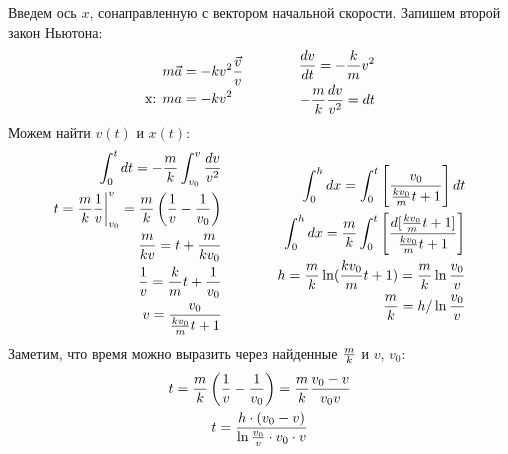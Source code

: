 \documentclass[a5paper,10pt]{article}
\begin{document}
Введем ось $x$, сонаправленную с вектором начальной скорости.
Запишем второй закон Ньютона:
\begin{equation*}
    \xdef\km{\frac{k}{m}}\xdef\mk{\frac{m}{k}}\xdef\mgk{\frac{mg}{k}}%
    \begin{aligned}[c]
        m\vec{a}&=-kv^2\frac{\vec{v}}{v}\\
        \text{x: } ma&=-kv^2\\
    \end{aligned}
        \qquad\qquad
    \begin{aligned}[c]
        \frac{dv}{dt}=-\km{}v^2\\
        -\mk\frac{dv}{v^2}=dt\\
    \end{aligned}
\end{equation*}
Можем найти $v(t)$ и $x(t)$:
\begin{equation*}
    \begin{aligned}[c]
        \int_0^{t}dt=-\mk\int_{v_0}^{v}\frac{dv}{v^2}\\
        t=\mk\frac{1}{v}\bigg|_{v_0}^{v}=\mk\left(\frac{1}{v}- \frac{1}{v_0}\right)\\
        \frac{m}{kv}=t+\frac{m}{kv_0}\\
        \frac{1}{v}=\km{t}+\frac{1}{v_0}\\
        v=\frac{v_0}{\frac{kv_0}{m}t+1}
    \end{aligned}
        \qquad\qquad
    \begin{aligned}[c]
        \int_0^{h}dx=\int_{0}^{t}\left[\frac{v_0}{\frac{kv_0}{m}t+1}\right]dt\\
        \int_0^{h}dx=\frac{m}{k}\int_{0}^{t}\left[\frac{d[\frac{kv_0}{m}t+1]}{\frac{kv_0}{m}t+1}\right]\\
        h=\mk\ln(\frac{kv_0}{m}t+1)=\mk\ln\frac{v_0}{v}\\
        \mk=h/\ln\frac{v_0}{v}
    \end{aligned}
\end{equation*}
Заметим, что время можно выразить через найденные $\mk$ и $v$, $v_0$:
\begin{gather*}
        t=\mk\left(\frac{1}{v}- \frac{1}{v_0}\right)=\mk\frac{v_0-v}{v_0v}\\
        t=\frac{h\cdot(v_0-v)}{\ln\frac{v_0}{v}\cdot{v_0}\cdot{v}}
\end{gather*}
\end{document}
